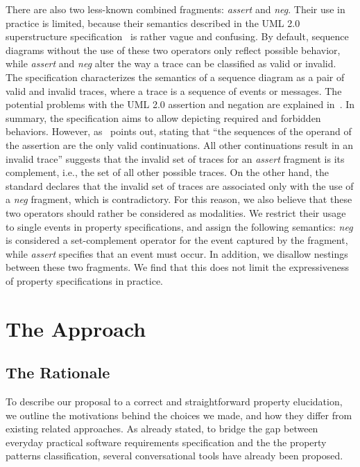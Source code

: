 \documentclass[letter]{llncs}
\begin{document}
There are also two less-known combined fragments: \emph{assert} and \emph{neg}. Their use in practice
is limited, because their semantics described in the UML 2.0 superstructure specification~\cite{UML2.4_superstructure}
is rather vague and confusing. By default, sequence diagrams without the use of these two operators 
only reflect possible behavior, while \emph{assert} and \emph{neg} alter the way 
a trace can be classified as valid or invalid. The specification characterizes
the semantics of a sequence diagram as a pair of valid and invalid traces,
where a trace is a sequence of events or messages.
The potential problems with the UML 2.0 assertion and negation are explained in~\cite{Harel07assertand}.
In summary, the specification aims to allow depicting required and forbidden behaviors.
However, as~\cite{Harel07assertand} points out, stating that ``the sequences of the operand of the assertion are the only valid continuations. All other continuations result in an invalid trace''
suggests that the invalid set of traces for an \emph{assert} fragment is its complement, i.e., the set of all other possible traces.
On the other hand, the standard declares that the
invalid set of traces are associated only with the use of
a \emph{neg} fragment, which is contradictory.
For this reason, we also believe that these two operators should rather be considered 
as modalities. We restrict their usage to single events in property specifications, and assign the following semantics:
\emph{neg} is considered a set-complement operator for the event captured by the fragment, while \emph{assert}
specifies that an event must occur. In addition, we
disallow nestings between these two fragments.
We find that this does not limit the expressiveness of property specifications in practice.
\section{The Approach}
\label{sec:Approach}

\subsection{The Rationale}
To describe our proposal to a correct and straightforward property elucidation,
we outline the motivations behind the choices we made, and how they differ from
existing related approaches. As already stated, to bridge the gap between everyday practical software 
requirements specification and the the property patterns classification,
several conversational tools have already been proposed. 
\end{document}

